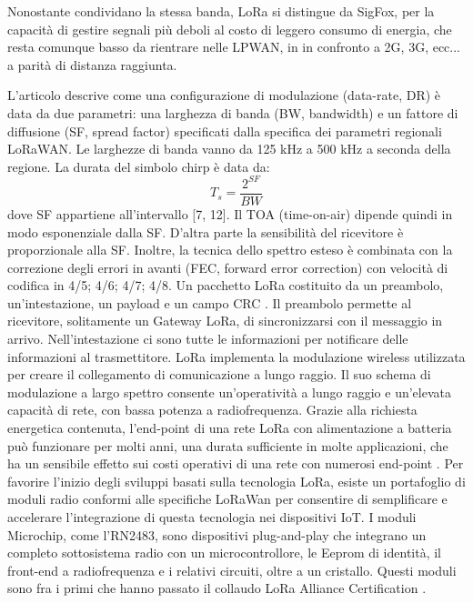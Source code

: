 \documentclass[a4paper]{report} %
\begin{document}
Nonostante condividano la stessa banda, LoRa si distingue da SigFox, per la capacità di gestire segnali più deboli al costo di leggero consumo di energia, che resta comunque basso da rientrare nelle LPWAN, in in confronto a 2G, 3G, ecc... a parità di distanza raggiunta.

L'articolo \cite{art:rif.48} descrive come una configurazione di modulazione (data-rate, DR) è data da due parametri: una larghezza di banda (BW, bandwidth) e un fattore di diffusione (SF, spread factor) specificati dalla specifica dei parametri regionali LoRaWAN. Le larghezze di banda vanno da 125 kHz a 500 kHz a seconda della regione. La durata del simbolo chirp è data da:
\begin{equation}
 T_s = \frac{2^{SF}}{BW}
\end{equation}
dove SF appartiene all'intervallo [7, 12]. Il TOA (time-on-air) dipende quindi in modo esponenziale dalla SF. D'altra parte la sensibilità del ricevitore è proporzionale alla SF. Inoltre, la tecnica dello spettro esteso è combinata con la correzione degli errori in avanti (FEC, forward error correction) con velocità di codifica in {4/5; 4/6; 4/7; 4/8}. Un pacchetto LoRa costituito da un preambolo, un'intestazione, un payload e un campo CRC \cite{art:rif.48}. 
Il preambolo permette al ricevitore, solitamente un Gateway LoRa, di sincronizzarsi con il messaggio in arrivo. Nell'intestazione ci sono tutte le informazioni per notificare delle informazioni al trasmettitore. 
LoRa implementa la modulazione wireless utilizzata per creare il collegamento di comunicazione a lungo raggio. 
Il suo schema di modulazione a largo spettro consente un'operatività a lungo raggio e un'elevata capacità di rete, con bassa potenza a radiofrequenza. Grazie alla richiesta energetica contenuta, l'end-point di una rete LoRa con alimentazione a batteria può funzionare per molti anni, una durata sufficiente in molte applicazioni, che ha un sensibile effetto sui costi operativi di una rete con numerosi end-point \cite{art:rif.23}. 
Per favorire l'inizio degli sviluppi basati sulla tecnologia LoRa, esiste un portafoglio di moduli radio conformi alle specifiche LoRaWan per consentire di semplificare e accelerare l'integrazione di questa tecnologia nei dispositivi IoT. I moduli Microchip, come l'RN2483, sono dispositivi plug-and-play che integrano un completo sottosistema radio con un microcontrollore, le Eeprom di identità, il front-end a radiofrequenza e i relativi circuiti, oltre a un cristallo. Questi moduli sono fra i primi che hanno passato il collaudo LoRa Alliance Certification \cite{art:rif.20}. 
\end{document}
